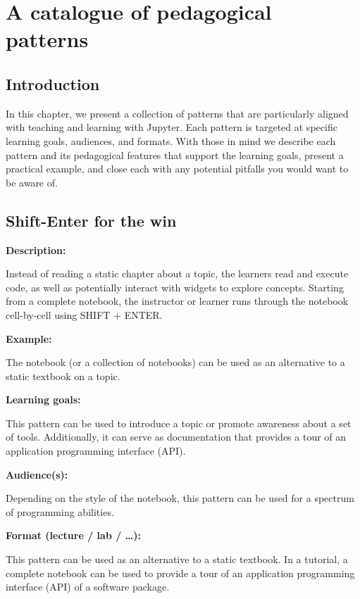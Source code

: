 \documentclass[]{book}
\begin{document}
\chapter{A catalogue of pedagogical patterns}\label{catalogue}

\section{Introduction}\label{introduction-1}

In this chapter, we present a collection of patterns that are
particularly aligned with teaching and learning with Jupyter. Each
pattern is targeted at specific learning goals, audiences, and formats.
With those in mind we describe each pattern and its pedagogical features
that support the learning goals, present a practical example, and close
each with any potential pitfalls you would want to be aware of.

\section{Shift-Enter for the win}\label{shift-enter-for-the-win}

\textbf{Description:}

Instead of reading a static chapter about a topic, the learners read and
execute code, as well as potentially interact with widgets to explore
concepts. Starting from a complete notebook, the instructor or learner
runs through the notebook cell-by-cell using SHIFT + ENTER.

\textbf{Example:}

The notebook (or a collection of notebooks) can be used as an
alternative to a static textbook on a topic.

\textbf{Learning goals:}

This pattern can be used to introduce a topic or promote awareness about
a set of tools. Additionally, it can serve as documentation that
provides a tour of an application programming interface (API).

\textbf{Audience(s):}

Depending on the style of the notebook, this pattern can be used for a
spectrum of programming abilities.

\textbf{Format (lecture / lab / \ldots{}):}

This pattern can be used as an alternative to a static textbook. In a
tutorial, a complete notebook can be used to provide a tour of an
application programming interface (API) of a software package.
\end{document}
